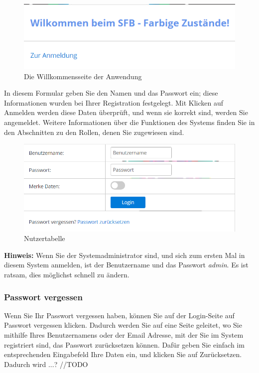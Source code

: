 \documentclass[enabledeprecatedfontcommands,fontsize=12pt,paper=a4,twoside]{scrartcl}
\begin{document}
\begin{figure}[h!]
\begin{center}
 \includegraphics[width=\textwidth]{screenshots/allgemein/willkommen.png}
  \caption{Die Willkommensseite der Anwendung}
  \label{fig:boat1}
\end{center}
\end{figure}

In diesem Formular geben Sie den Namen und das Passwort ein; diese Informationen wurden bei Ihrer Registration festgelegt. Mit Klicken auf Anmelden werden diese Daten überprüft, und wenn sie korrekt sind, werden Sie angemeldet. Weitere Informationen über die Funktionen des Systems finden Sie in den Abschnitten zu den Rollen, denen Sie zugewiesen sind. \\

\begin{figure}[h!]
\begin{center}
 \includegraphics[width=\textwidth]{screenshots/allgemein/login.png}
  \caption{Nutzertabelle}
  \label{fig:boat1}
\end{center}
\end{figure}

\textbf{Hinweis:} Wenn Sie der Systemadministrator sind, und sich zum ersten Mal in diesem System anmelden, ist der Benutzername und das Passwort \textit{admin}. Es ist ratsam, dies möglichst schnell zu ändern. \\


\subsubsection{Passwort vergessen}
Wenn Sie Ihr Passwort vergessen haben, können Sie auf der Login-Seite auf Passwort vergessen klicken. Dadurch werden Sie auf eine Seite geleitet, wo Sie mithilfe Ihres Benutzernamens oder der Email Adresse, mit der Sie im System registriert sind, das Passwort zurücksetzen können. Dafür geben Sie einfach im entsprechenden Eingabefeld Ihre Daten ein, und klicken Sie auf Zurücksetzen. Dadurch wird ...? //TODO
\end{document}

